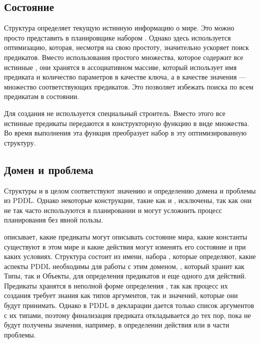 \subsection{Состояние}

Структура  определяет текущую истинную информацию о мире.
Это можно просто представить в планировщике набором .
Однако здесь используется оптимизацию,
которая, несмотря на свою простоту, значительно ускоряет поиск предикатов.
Вместо использования простого множества, которое содержит все истинные ,
они хранятся в ассоциативном массиве,
который использует имя предиката и количество параметров в качестве ключа,
а в качестве значения --- множество соответствующих предикатов.
Это позволяет избежать поиска по всем предикатам в состоянии.

Для создания  не используется специальный строитель.
Вместо этого все истинные предикаты передаются в конструкторную функцию в виде множества.
Во время выполнения эта функция преобразует набор в эту оптимизированную структуру.

\subsection{Домен и проблема}

Структуры  и  в целом соответствуют
значению и определению домена и проблемы из PDDL.
Однако некоторые конструкции, такие как  и ,
исключены, так как они не так часто используются в планировании
и могут усложнить процесс планирования без явной пользы.

 описывает, какие предикаты могут описывать состояние мира,
какие константы существуют в этом мире
и какие действия могут изменять его состояние и при каких условиях.
Структура  состоит из имени, набора ,
которые определяют, какие аспекты PDDL необходимы для работы с этим доменом\footnotemark{},
, который хранит как Типы, так и Объекты,
 для определения предикатов и еще одного  для действий.
Предикаты хранятся в неполной форме определения ,
так как процесс их создания требует знания как типов аргументов,
так и значений, которые они будут принимать.
Однако в PDDL в декларации  дается только список аргументов с их типами,
поэтому финализация предиката откладывается до тех пор,
пока не будут получены значения, например, в определении действия или в части  проблемы.

